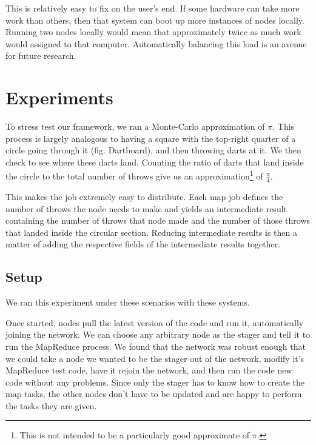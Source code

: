 \documentclass[conference, compsocconf, letterpaper]{IEEEtran}
\begin{document}
This is relatively easy to fix on the user's end.  If some hardware can take more work than others, then that system can boot up more instances of nodes locally. Running two nodes locally would mean that approximately twice as much work would assigned to that computer.  Automatically balancing this load is an avenue for future research.







\section{Experiments}
To stress test our framework, we ran a Monte-Carlo approximation of $\pi$. This process is largely analogous to having a square with the top-right quarter of a circle going through it (fig. Dartboard), and then throwing darts at it.  We then check to see where these darts land.  Counting the ratio of darts that land inside the circle to the total number of throws give us an approximation\footnote{This is not intended to be a particularly good approximate of $\pi$.} of $\frac{\pi}{4}$.

This makes the job extremely easy to distribute.  Each map job defines the number of throws the node needs to make and yields an intermediate result containing the number of throws that node made and the number of those throws that landed inside the circular section.  Reducing intermediate results is then a matter of adding the respective fields of the intermediate results together. 

\subsection{Setup}
We ran this experiment under these scenarios with these systems.

Once started, nodes pull the latest version of the code and run it, automatically joining the network.  We can choose any arbitrary node as the stager and tell it to run the MapReduce process. We found that the network was robust enough that we could take a node we wanted to be the stager out of the network, modify it's MapReduce test code, have it rejoin the network, and then run the code new code without any problems. Since only the stager has to know how to create the map tasks, the other nodes don't have to be updated and are happy to perform the tasks they are given.
\end{document}
